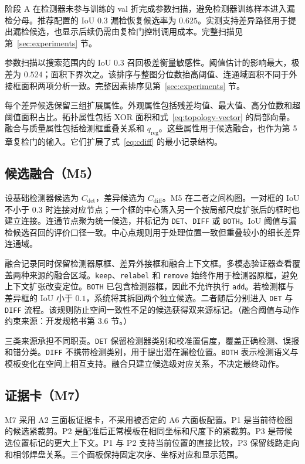 阶段 A 在检测器未参与训练的 val 折完成参数扫描，避免检测器训练样本进入漏检分母。推荐配置的 IoU 0.3 漏检恢复候选率为 $0.625$。实测支持差异路径用于提出漏检候选，也显示后续仍需由复检门控制调用成本。完整扫描见第~\ref{sec:experiments} 节。

参数扫描以搜索范围内的 IoU 0.3 召回极差衡量敏感性。阈值估计的影响最大，极差为 $0.524$；面积下界次之。该排序与整图分位数抬高阈值、连通域面积不同于外接框面积两项分析一致。完整因素排序见第~\ref{sec:experiments} 节。

每个差异候选保留三组扩展属性。外观属性包括残差均值、最大值、高分位数和超阈值面积占比。拓扑属性包括 XOR 面积和式~\eqref{eq:topology-vector} 的局部向量。融合与质量属性包括检测框重叠关系和 $q_{\mathrm{reg}}$。这些属性用于候选融合，也作为第 5 章复检门的输入。它们扩展了式~\eqref{eq:cdiff} 的最小记录结构。

\subsection{候选融合（M5）}
\label{subsec:candidate-fusion}

设基础检测器候选为 $C_{\mathrm{det}}$，差异候选为 $C_{\mathrm{diff}}$。M5 在二者之间构图。一对框的 IoU 不小于 $0.3$ 时连接对应节点；一个框的中心落入另一个按局部尺度扩张后的框时也建立连接。连通节点聚为统一候选，并标记为 \texttt{DET}、\texttt{DIFF} 或 \texttt{BOTH}。IoU 阈值与漏检候选召回的评价口径一致。中心点规则用于处理位置一致但重叠较小的细长差异连通域。

融合记录同时保留检测器原框、差异外接框和融合上下文框。多模态验证器查看覆盖两种来源的融合区域。\texttt{keep}、\texttt{relabel} 和 \texttt{remove} 始终作用于检测器原框，避免上下文扩张改变定位。\texttt{BOTH} 已包含检测器框，因此不允许执行 \texttt{add}。若检测框与差异框的 IoU 小于 $0.1$，系统将其拆回两个独立候选。二者随后分别进入 \texttt{DET} 与 \texttt{DIFF} 流程。该规则防止空间一致性不足的候选获得双来源标记。（融合阈值与动作约束来源：开发规格书第 3.6 节。）

三类来源承担不同职责。\texttt{DET} 保留检测器类别和校准置信度，覆盖正确检测、误报和错分类。\texttt{DIFF} 不携带检测类别，用于提出潜在漏检位置。\texttt{BOTH} 表示检测语义与模板变化在空间上相互支持。融合只建立候选级对应关系，不决定最终动作。

\subsection{证据卡（M7）}
\label{subsec:evidence-card}

M7 采用 A2 三面板证据卡，不采用被否定的 A6 六面板配置。P1 是当前待检图的候选紧裁剪。P2 是配准后正常模板在相同坐标和尺度下的紧裁剪。P3 是带候选位置标记的更大上下文。P1 与 P2 支持当前位置的直接比较，P3 保留线路走向和相邻焊盘关系。三个面板保持固定次序、坐标对应和显示范围。

